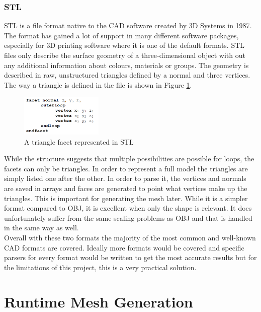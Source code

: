 \subsubsection{STL}
STL is a file format native to the CAD software created by 3D Systems in 1987\cite{}. The format has gained a lot of support in many different software packages, especially for 3D printing software where it is one of the default formats. STL files only describe the surface geometry of a three-dimensional object with out any additional information about colours, materials or groups. The geometry is described in raw, unstructured triangles defined by a normal and three vertices. The way a triangle is defined in the file is shown in Figure \ref{fig:STLFormat}. 
\begin{figure}[htpb]
	\centering
	\includegraphics[width=0.35\textwidth]{fig/STLFormat.png}
	\caption[STL Triangle facet]{A triangle facet represented in STL\protect}
	\label{fig:STLFormat}
\end{figure}

While the structure suggests that multiple possibilities are possible for loops, the facets can only be triangles. In order to represent a full model the triangles are simply listed one after the other. In order to parse it, the vertices and normals are saved in arrays and faces are generated to point what vertices make up the triangles. This is important for generating the mesh later. While it is a simpler format compared to OBJ, it is excellent when only the shape is relevant. It does unfortunately suffer from the same scaling problems as OBJ and that is handled in the same way as well.\\
Overall with these two formats the majority of the most common and well-known CAD formats are covered. Ideally more formats would be covered and specific parsers for every format would be written to get the most accurate results but for the limitations of this project, this is a very practical solution.

\section{Runtime Mesh Generation}

